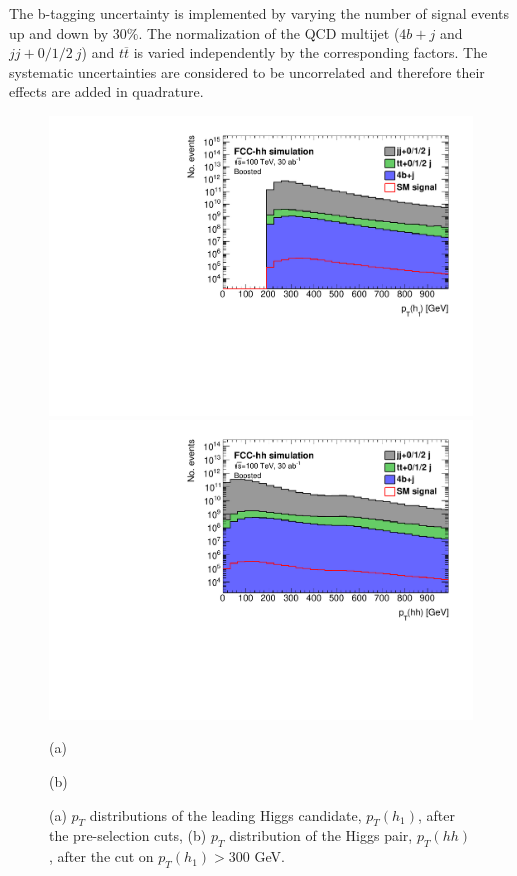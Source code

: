 The b-tagging uncertainty is implemented by varying the number of signal events up and down by $30\%$. The normalization of the QCD multijet ($4b+j$ and $jj+0/1/2~j$) and $t\overline{t}$ is varied independently by the corresponding factors. The systematic uncertainties are considered to be uncorrelated and therefore their effects are added in quadrature.

\begin{figure}
	\centering
	\begin{minipage}{.5\textwidth}
		\centering
		\includegraphics[width=\linewidth]{./images/hist_h1_pt_stack.pdf}
	\end{minipage}%
	\begin{minipage}{.5\textwidth}
		\centering
		\includegraphics[width=\linewidth]{./images/hist_hh_pt_stack.pdf}
	\end{minipage}
	\begin{minipage}[t]{0.5\textwidth}
		\caption*{(a)}
	\end{minipage}%
	\hfill
	\begin{minipage}[t]{0.5\textwidth}
		\caption*{(b)}
	\end{minipage}
	\caption{(a) $p_T$ distributions of the leading Higgs candidate, $p_T(h_1)$, after the pre-selection cuts, (b) $p_T$ distribution of the Higgs pair, $p_T(hh)$, after the cut on $p_T(h_1)>300$ GeV.}
	\label{fig:pt_stack}
\end{figure}

